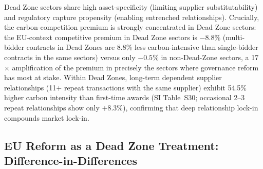 \documentclass[11pt,a4paper]{article}
\begin{document}
Dead Zone sectors share high asset-specificity (limiting supplier substitutability) and regulatory capture propensity (enabling entrenched relationships). Crucially, the carbon-competition premium is strongly concentrated in Dead Zone sectors: the EU-context competitive premium in Dead Zone sectors is $-8.8\%$ (multi-bidder contracts in Dead Zones are $8.8\%$ less carbon-intensive than single-bidder contracts in the same sectors) versus only $-0.5\%$ in non-Dead-Zone sectors, a 17$\times$ amplification of the premium in precisely the sectors where governance reform has most at stake. Within Dead Zones, long-term dependent supplier relationships (11$+$ repeat transactions with the same supplier) exhibit 54.5\% higher carbon intensity than first-time awards (SI Table~S30; occasional 2--3 repeat relationships show only $+8.3\%$), confirming that deep relationship lock-in compounds market lock-in.

\subsection{EU Reform as a Dead Zone Treatment: Difference-in-Differences}
\end{document}

